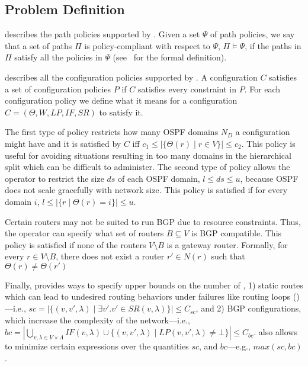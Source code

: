 \subsection{Problem Definition}



 describes the path policies supported by \name.
Given  a set $\Psi$ of
path policies, we say that
a set of paths $\Pi$ is policy-compliant with respect to $\Psi$, $\Pi \models \Psi$,
if the paths in $\Pi$ satisfy all the policies in $\Psi$ (see~\cite{genesis} for the formal definition). 


 describes all the configuration policies supported by \name.
A configuration $C$ satisfies a set of configuration policies $P$
if $C$ satisfies every constraint in $P$.
For each configuration policy 
we define what it means for  a configuration $C=(\Theta,W,LP,IF,SR)$ to satisfy it.

The first type of policy restricts how many OSPF domains $N_D$ a
configuration might have
and it is satisfied by $C$ iff $c_1\leq |\{\Theta(r)\mid r\in V\}|\leq
c_2$.  This policy is useful for avoiding situations resulting in too
many domains in the hierarchical split which can be difficult to
administer.  The second type of policy allows the operator to restrict
the size $ds$ of each OSPF domain, $l\leq ds\leq u$, because OSPF does
not scale gracefully with network size.  This policy is satisfied if
for every domain $i$, $l\leq |\{r \mid \Theta(r)=i\}|\leq u$.


Certain 
	routers may not be suited to run BGP due to resource
	constraints. Thus, the operator can specify what set of 
	routers $B\subseteq V$ is BGP compatible.  
	This policy is satisfied if none of the routers $V\setminus B$
	is a gateway router.
	Formally, for every $r\in V\setminus B$,
	there does not exist a router $r'\in N(r)$ such that $\Theta(r) \not= \Theta(r')$

Finally, \name provides ways to specify upper bounds on the number of
,
1) static routes which can lead to undesired routing behaviors under failures like routing loops ()---i.e., $sc=|\{(v, v', \lambda)\mid \exists v'. v' \in SR(v,\lambda)\}|\leq C_{sc}$, and
2) BGP configurations, which increase the complexity of the network---i.e., 
$bc=|\bigcup_{v,\lambda\in V\times\Lambda} IF(v,\lambda)\cup \{(v,v',\lambda)\mid LP(v,v',\lambda)\neq \bot\}|\leq C_{bc}$.
\name also allows to minimize certain expressions over the quantities $sc$, and $bc$---e.g., $max(sc, bc)$. 

